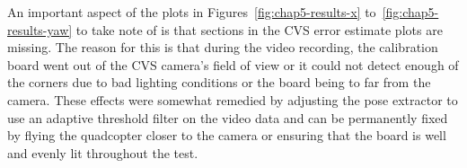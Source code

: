 
An important aspect of the plots in Figures~\ref{fig:chap5-results-x} to~\ref{fig:chap5-results-yaw} to take note of is that sections in the CVS error estimate plots are missing. The reason for this is that during the video recording, the calibration board went out of the CVS camera's field of view or it could not detect enough of the corners due to bad lighting conditions or the board being to far from the camera. These effects were somewhat remedied by adjusting the pose extractor to use an adaptive threshold filter on the video data and can be permanently fixed by flying the quadcopter closer to the camera or ensuring that the board is well and evenly lit throughout the test. 

